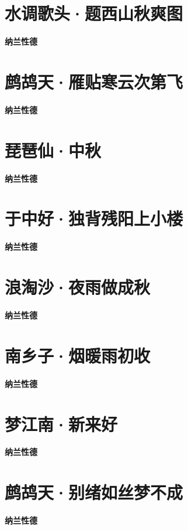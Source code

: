 \documentclass[12pt,a4paper]{ctexbook}
\begin{document}
\section{水调歌头·题西山秋爽图}
\textbf{纳兰性德}\par\vspace{0.5em}

\section{鹧鸪天·雁贴寒云次第飞}
\textbf{纳兰性德}\par\vspace{0.5em}

\section{琵琶仙·中秋}
\textbf{纳兰性德}\par\vspace{0.5em}

\section{于中好·独背残阳上小楼}
\textbf{纳兰性德}\par\vspace{0.5em}

\section{浪淘沙·夜雨做成秋}
\textbf{纳兰性德}\par\vspace{0.5em}

\section{南乡子·烟暖雨初收}
\textbf{纳兰性德}\par\vspace{0.5em}

\section{梦江南·新来好}
\textbf{纳兰性德}\par\vspace{0.5em}

\section{鹧鸪天·别绪如丝梦不成}
\textbf{纳兰性德}\par\vspace{0.5em}
\end{document}
